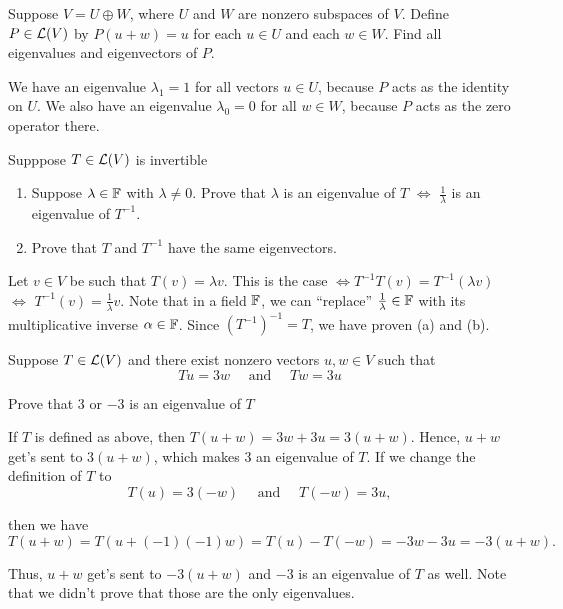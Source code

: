\begin{xrcs}
  Suppose $V = U \oplus W$, where $U$ and $W$ are nonzero subspaces of $V$. Define $P \in \mathcal{L}(V)$ by $P(u+w) = u$ for each $u \in U$ and each $w \in W$. Find all eigenvalues and eigenvectors of $P$.

  \begin{xsol}
    We have an eigenvalue $\lambda_1 = 1$ for all vectors $u \in U$, because $P$ acts as the identity on $U$. We also have an eigenvalue $\lambda_0 = 0$ for all $w \in W$, because $P$ acts as the zero operator there.
  \end{xsol}
\end{xrcs}

\begin{xrcs}
  Supppose $T \in \mathcal{L}(V)$ is invertible
  \begin{enumerate}
    \item Suppose $\lambda \in \mathbb{F}$ with $\lambda \neq 0$. Prove that $\lambda$ is an eigenvalue of $T$ $\iff$ $\frac{1}{\lambda}$ is an eigenvalue of $T^{-1}$.
    \item Prove that $T$ and $T^{-1}$ have the same eigenvectors.
  \end{enumerate}
  \begin{xsol}
    Let $v \in V$ be such that $T(v) = \lambda v$. This is the case $\iff T^{-1} T(v) = T^{-1} (\lambda v)$ $\iff$ $T^{-1} (v) = \frac{1}{\lambda} v$. Note that in a field $\mathbb{F}$, we can ``replace'' $\frac{1}{\lambda}\in \mathbb{F}$ with its multiplicative inverse $\alpha \in \mathbb{F}$. Since $\left(T^{-1}\right)^{-1} = T$, we have proven (a) and (b).
  \end{xsol}
\end{xrcs}

\begin{xrcs}
  Suppose $T \in \mathcal{L}(V)$ and there exist nonzero vectors $u, w \in V$ such that
  \begin{equation}
    Tu = 3w \quad \text{ and } \quad Tw = 3u
  \end{equation}

  Prove that $3$ or $-3$ is an eigenvalue of $T$

  \begin{xsol}
    If $T$ is defined as above, then $T(u+w) = 3w + 3u = 3(u+w)$. Hence, $u+w$ get's sent to $3(u+w)$, which makes $3$ an eigenvalue of $T$. If we change the definition of $T$ to
    \begin{equation}
      T(u) = 3(-w) \quad \text{ and } \quad T(-w) = 3u,
    \end{equation}

    then we have
    \begin{equation}
      T(u+w) = T(u + (-1)(-1)w) = T(u) - T(-w) = -3w -3u = -3 (u+w).
    \end{equation}

    Thus, $u+w$ get's sent to $-3 (u+w)$ and $-3$ is an eigenvalue of $T$ as well. Note that we didn't prove that those are the only eigenvalues.
  \end{xsol}
\end{xrcs}


